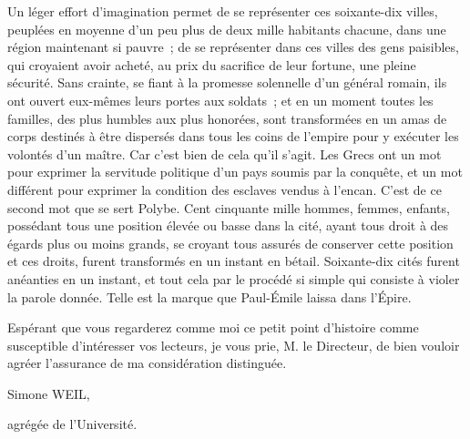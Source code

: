 \documentclass[french,twoside]{book} %
\begin{document}
Un léger effort d'imagination permet de se représenter ces soixante-dix villes, peuplées en moyenne d'un peu plus de deux mille habitants chacune, dans une région maintenant si pauvre ; de se représenter dans ces villes des gens paisibles, qui croyaient avoir acheté, au prix du sacrifice de leur fortune, une pleine sécurité. Sans crainte, se fiant à la promesse solennelle d'un général romain, ils ont ouvert eux-mêmes leurs portes aux soldats ; et en un moment toutes les familles, des plus humbles aux plus honorées, sont transformées en un amas de corps destinés à être dispersés dans tous les coins de l'empire pour y exécuter les volontés d'un maître. Car c'est bien de cela qu'il s'agit. Les Grecs ont un mot pour exprimer la servitude politique d'un pays soumis par la conquête, et un mot différent pour exprimer la condition des esclaves vendus à l'encan. C'est de ce second mot que se sert Polybe. Cent cinquante mille hommes, femmes, enfants, possédant tous une position élevée ou basse dans la cité, ayant tous droit à des égards plus ou moins grands, se croyant tous assurés de conserver cette position et ces droits, furent transformés en un instant en bétail. Soixante-dix cités furent anéanties en un instant, et tout cela par le procédé si simple qui consiste à violer la parole donnée. Telle est la marque que Paul-Émile laissa dans l'Épire.\par
Espérant que vous regarderez comme moi ce petit point d'histoire comme susceptible d'intéresser vos lecteurs, je vous prie, M. le Directeur, de bien vouloir agréer l'assurance de ma considération distinguée.\par
Simone WEIL,\par
agrégée de l'Université.\par

\begin{center}
\end{center}
\end{document}
